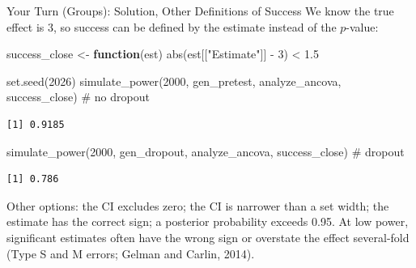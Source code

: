 \documentclass[
  ignorenonframetext,
  aspectratio=169,
]{beamer}
\newenvironment{Shaded}{\begin{snugshade}}{\end{snugshade}}
\newcommand{\CommentTok}[1]{\textcolor[rgb]{0.37,0.37,0.37}{#1}}
\newcommand{\ControlFlowTok}[1]{\textcolor[rgb]{0.00,0.23,0.31}{\textbf{#1}}}
\newcommand{\DecValTok}[1]{\textcolor[rgb]{0.68,0.00,0.00}{#1}}
\newcommand{\FloatTok}[1]{\textcolor[rgb]{0.68,0.00,0.00}{#1}}
\newcommand{\FunctionTok}[1]{\textcolor[rgb]{0.28,0.35,0.67}{#1}}
\newcommand{\NormalTok}[1]{\textcolor[rgb]{0.00,0.23,0.31}{#1}}
\newcommand{\OtherTok}[1]{\textcolor[rgb]{0.00,0.23,0.31}{#1}}
\newcommand{\SpecialCharTok}[1]{\textcolor[rgb]{0.37,0.37,0.37}{#1}}
\newcommand{\StringTok}[1]{\textcolor[rgb]{0.13,0.47,0.30}{#1}}
\begin{document}
\begin{frame}[fragile]{Your Turn (Groups): Solution, Other Definitions
of Success}
\label{your-turn-groups-solution-other-definitions-of-success}
\small We know the true effect is 3, so success can be defined by the
estimate instead of the \(p\)-value:

\begin{Shaded}
\begin{Highlighting}[]
\NormalTok{success\_close }\OtherTok{\textless{}{-}} \ControlFlowTok{function}\NormalTok{(est) }\FunctionTok{abs}\NormalTok{(est[[}\StringTok{"Estimate"}\NormalTok{]] }\SpecialCharTok{{-}} \DecValTok{3}\NormalTok{) }\SpecialCharTok{\textless{}} \FloatTok{1.5}

\FunctionTok{set.seed}\NormalTok{(}\DecValTok{2026}\NormalTok{)}
\FunctionTok{simulate\_power}\NormalTok{(}\DecValTok{2000}\NormalTok{, gen\_pretest, analyze\_ancova, success\_close) }\CommentTok{\# no dropout}
\end{Highlighting}
\end{Shaded}

\begin{verbatim}
[1] 0.9185
\end{verbatim}

\begin{Shaded}
\begin{Highlighting}[]
\FunctionTok{simulate\_power}\NormalTok{(}\DecValTok{2000}\NormalTok{, gen\_dropout, analyze\_ancova, success\_close) }\CommentTok{\# dropout}
\end{Highlighting}
\end{Shaded}

\begin{verbatim}
[1] 0.786
\end{verbatim}

\scriptsize Other options: the CI excludes zero; the CI is narrower than
a set width; the estimate has the correct sign; a posterior probability
exceeds 0.95. At low power, significant estimates often have the wrong
sign or overstate the effect several-fold (Type S and M errors; Gelman
and Carlin, 2014).
\end{frame}
\end{document}
